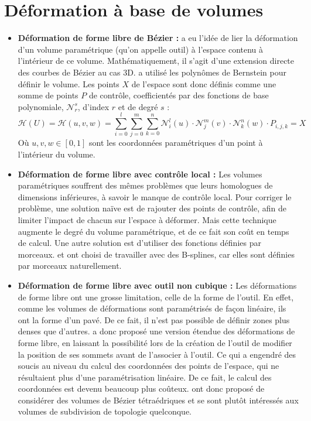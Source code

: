 \section{Déformation à base de volumes}
\begin{itemize}
\item{\textbf{Déformation de forme libre de Bézier :}} \cite{SP86} a
  eu l'idée de lier la déformation d'un volume paramétrique (qu'on
  appelle outil) à l'espace contenu à l'intérieur de ce
  volume. Mathématiquement, il s'agit d'une extension directe des
  courbes de Bézier au cas 3D. \cite{SP86} a utilisé les polynômes de
  Bernstein pour définir le volume. Les points $X$ de l'espace sont
  donc définis comme une somme de points $P$ de contrôle,
  coefficientés par des fonctions de base polynomiale,
  $\mathcal{N}_r^s$, d'index $r$ et de degré $s$ :
  \begin{equation}
    \mathcal{H}(U) = \mathcal{H}(u,v,w) = 
    \sum_{i=0}^l \sum_{j=0}^m \sum_{k=0}^n
    \mathcal{N}_i^l(u) \cdot \mathcal{N}_j^m(v) \cdot \mathcal{N}_k^n(w) \cdot P_{i,j,k} = X
  \end{equation}
  Où $u,v,w \in [0,1]$ sont les coordonnées paramétriques d'un point à
  l'intérieur du volume.
\item{\textbf{Déformation de forme libre avec contrôle local :}} Les
  volumes paramétriques souffrent des mêmes problèmes que leurs
  homologues de dimensions inférieures, à savoir le manque de contrôle
  local. Pour corriger le problème, une solution naïve est de rajouter
  des points de contrôle, afin de limiter l'impact de chacun sur
  l'espace à déformer. Mais cette technique augmente le degré du
  volume paramétrique, et de ce fait son coût en temps de calcul. Une
  autre solution est d'utiliser des fonctions définies par
  morceaux. \cite{GP89} et \cite{Com89} ont choisi de travailler avec
  des B-splines, car elles sont définies par morceaux naturellement.
\item{\textbf{Déformation de forme libre avec outil non cubique :}}
  Les déformations de forme libre ont une grosse limitation, celle de
  la forme de l'outil. En effet, comme les volumes de déformations
  sont paramétrisés de façon linéaire, ils ont la forme d'un pavé. De
  ce fait, il n'est pas possible de définir zones plus denses que
  d'autres. \cite{Coq90} a donc proposé une version étendue des
  déformations de forme libre, en laissant la possibilité lors de la
  création de l'outil de modifier la position de ses sommets avant de
  l'associer à l'outil. Ce qui a engendré des soucis au niveau du
  calcul des coordonnées des points de l'espace, qui ne résultaient
  plus d'une paramétrisation linéaire. De ce fait, le calcul des
  coordonnées est devenu beaucoup plus coûteux. \cite{BBT97} ont donc
  proposé de considérer des volumes de Bézier tétraédriques et
  \cite{MJ96} se sont plutôt intéressés aux volumes de subdivision de
  topologie quelconque.
\end{itemize}

